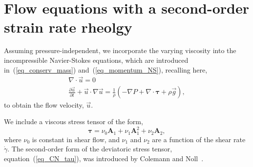 \section{Flow equations with a second-order strain rate rheolgy}
Assuming pressure-independent, we incorporate the varying viscosity into the incompressible Navier-Stokes equations, which are introduced in~(\ref{eq_conserv_mass}) and~(\ref{eq_momentum_NS}), recalling here,
\begin{align}
  \nabla \cdot \vec{u} = 0 
  \nonumber
  \\
  \frac{\partial \vec{u}}{\partial t} + \vec{u}\cdot \nabla \vec{u}
  = \frac{1}{\rho}
  \left(
  - \nabla P 
      + \nabla \cdot   \bm{\tau} 
      +  \rho  \vec{g} 
      \right),
      \nonumber
\end{align}
to obtain the flow velocity, $\vec{u}$.

We include a viscous stress tensor of the form,
\begin{equation}
   \boldsymbol{\tau} = 
    \nu_0  \bm{A}_1 +  \nu_1  \bm{A}_1^2 + \nu_2 \bm{A}_2,
   \label{eq_CN_tau}
\end{equation}
where $\nu_0$ is constant in shear flow, and $\nu_1$ and $\nu_2$ are a function of the shear rate $\dot{\gamma}$.
The second-order form of the deviatoric stress tensor, equation~(\ref{eq_CN_tau}), was introduced by Colemann and Noll~\cite{coleman_approximation_1960}.

